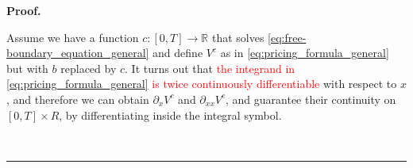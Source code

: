 \documentclass{tufte-handout}
\newcommand{\R}{\mathbb{R}} %
\newcommand{\red}[1]{\textcolor{red}{#1}}
\newenvironment{pf}[1][Proof]{\textbf{#1.} }{\ \rule{0.5em}{0.5em}}
\begin{document}
	\begin{pf}

			
			Assume we have a function $c:[0,T]\rightarrow \mathbb{R}$ that solves \eqref{eq:free-boundary_equation_general} and define $V^c$ as in \eqref{eq:pricing_formula_general} but with $b$ replaced by $c$. It turns out that \red{the integrand in \eqref{eq:pricing_formula_general} is twice continuously differentiable} with respect to $x$, and therefore we can obtain $\partial_x V^c$ and $\partial_{xx} V^c$, and guarantee their continuity on $[0, T]\times R$, by differentiating inside the integral symbol.
			
			
%			
%			
%			
%			

\end{pf}
\end{document}
